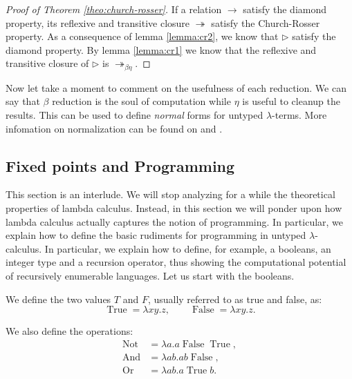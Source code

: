 \begin{proof}[Proof of Theorem \ref{theo:church-rosser}]   If a relation $\to$ satisfy the diamond property, its reflexive and transitive closure $\twoheadrightarrow$ satisfy the Church-Rosser property. As a consequence of lemma \ref{lemma:cr2}, we know that $\triangleright$ satisfy the diamond property.  By lemma \ref{lemma:cr1} we know that the reflexive and transitive closure of $\triangleright$ is $\twoheadrightarrow_{\beta\eta}$.
\end{proof}

Now let take a moment to comment on the usefulness of each reduction. We can say that $\beta$ reduction is the soul of computation  while $\eta$ is useful to cleanup the results.  This can be used to define \emph{normal} forms for untyped $\lambda$-terms. More infomation on normalization can be found on \cite[Section 7]{selinger2008lecture} and \cite{baader1999term}. \\


\subsection{Fixed points and Programming}
This section is an interlude. We will stop analyzing for a while the theoretical properties of lambda calculus. Instead, in this section we will ponder upon how lambda calculus actually captures the notion of programming. In particular, we explain how to define the basic rudiments for programming in untyped $\lambda$-calculus. In particular, we explain how to define, for example, a booleans, an integer type and a recursion operator, thus showing the computational potential of recursively enumerable languages. Let us start with the booleans.

\begin{definition} \label{def:untyped-natural} 
  We define the two values $T$ and $F$, usually referred to as true and false, as:
  $$\operatorname{True} = \lambda xy.z,\qquad    \operatorname{False} = \lambda xy.z.$$

  We also define the operations:
  \begin{align*}
    \operatorname{Not} &= \lambda a.a\operatorname{False}\operatorname{True},\\
    \operatorname{And} &= \lambda ab.ab\operatorname{False},\\
    \operatorname{Or} &= \lambda ab.a\operatorname{True}b.
  \end{align*}
\end{definition}

